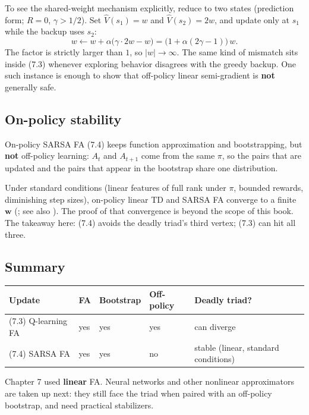 To see the shared-weight mechanism explicitly, reduce to two states (prediction form; $R=0$, $\gamma>1/2$). Set $\hat{V}(s_1)=w$ and $\hat{V}(s_2)=2w$, and update only at $s_1$ while the backup uses $s_2$:
\[
w
\leftarrow
w+\alpha\bigl(\gamma\cdot 2w-w\bigr)
=
\bigl(1+\alpha(2\gamma-1)\bigr)\,w.
\]
The factor is strictly larger than $1$, so $|w|\to\infty$. The same kind of mismatch sits inside (7.3) whenever exploring behavior disagrees with the greedy backup. One such instance is enough to show that off-policy linear semi-gradient is \textbf{not} generally safe.

\subsection{On-policy stability}

On-policy SARSA FA (7.4) keeps function approximation and bootstrapping, but \textbf{not} off-policy learning: $A_t$ and $A_{t+1}$ come from the same $\pi$, so the pairs that are updated and the pairs that appear in the bootstrap share one distribution.

Under standard conditions (linear features of full rank under $\pi$, bounded rewards, diminishing step sizes), on-policy linear TD and SARSA FA converge to a finite $\mathbf{w}$ (; see also ). The proof of that convergence is beyond the scope of this book. The takeaway here: (7.4) avoids the deadly triad's third vertex; (7.3) can hit all three.

\subsection{Summary}

\begin{center}
\begin{tabular}{lllll}
\toprule
Update & FA & Bootstrap & Off-policy & Deadly triad? \\
\midrule
(7.3) Q-learning FA & yes & yes & yes & can diverge \\
(7.4) SARSA FA & yes & yes & no & stable (linear, standard conditions) \\
\bottomrule
\end{tabular}
\end{center}

Chapter 7 used \textbf{linear} FA. Neural networks and other nonlinear approximators are taken up next: they still face the triad when paired with an off-policy bootstrap, and need practical stabilizers.
